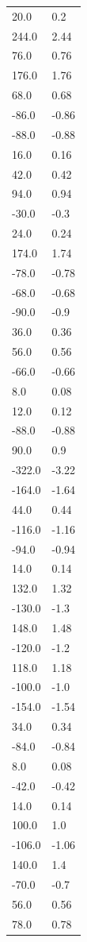 \begin{longtable}{ll}
20.0 & 0.2 \\
244.0 & 2.44 \\
76.0 & 0.76 \\
176.0 & 1.76 \\
68.0 & 0.68 \\
-86.0 & -0.86 \\
-88.0 & -0.88 \\
16.0 & 0.16 \\
42.0 & 0.42 \\
94.0 & 0.94 \\
-30.0 & -0.3 \\
24.0 & 0.24 \\
174.0 & 1.74 \\
-78.0 & -0.78 \\
-68.0 & -0.68 \\
-90.0 & -0.9 \\
36.0 & 0.36 \\
56.0 & 0.56 \\
-66.0 & -0.66 \\
8.0 & 0.08 \\
12.0 & 0.12 \\
-88.0 & -0.88 \\
90.0 & 0.9 \\
-322.0 & -3.22 \\
-164.0 & -1.64 \\
44.0 & 0.44 \\
-116.0 & -1.16 \\
-94.0 & -0.94 \\
14.0 & 0.14 \\
132.0 & 1.32 \\
-130.0 & -1.3 \\
148.0 & 1.48 \\
-120.0 & -1.2 \\
118.0 & 1.18 \\
-100.0 & -1.0 \\
-154.0 & -1.54 \\
34.0 & 0.34 \\
-84.0 & -0.84 \\
8.0 & 0.08 \\
-42.0 & -0.42 \\
14.0 & 0.14 \\
100.0 & 1.0 \\
-106.0 & -1.06 \\
140.0 & 1.4 \\
-70.0 & -0.7 \\
56.0 & 0.56 \\
78.0 & 0.78 \\

\end{longtable}

